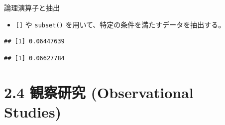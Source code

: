 \documentclass[
  ignorenonframetext,
]{beamer}
\newenvironment{Shaded}{\begin{snugshade}}{\end{snugshade}}
\newcommand{\AttributeTok}[1]{\textcolor[rgb]{0.77,0.63,0.00}{#1}}
\newcommand{\CommentTok}[1]{\textcolor[rgb]{0.56,0.35,0.01}{\textit{#1}}}
\newcommand{\FunctionTok}[1]{\textcolor[rgb]{0.00,0.00,0.00}{#1}}
\newcommand{\NormalTok}[1]{#1}
\newcommand{\OtherTok}[1]{\textcolor[rgb]{0.56,0.35,0.01}{#1}}
\newcommand{\SpecialCharTok}[1]{\textcolor[rgb]{0.00,0.00,0.00}{#1}}
\newcommand{\StringTok}[1]{\textcolor[rgb]{0.31,0.60,0.02}{#1}}
\providecommand{\tightlist}{%
  \setlength{\itemsep}{0pt}\setlength{\parskip}{0pt}}
\begin{document}
\begin{frame}[fragile]{論理演算子と抽出}
\protect\hypertarget{ux8ad6ux7406ux6f14ux7b97ux5b50ux3068ux62bdux51fa}{}
\begin{itemize}
\tightlist
\item
  \texttt{{[}{]}} や \texttt{subset()}
  を用いて、特定の条件を満たすデータを抽出する。
\end{itemize}

\begin{Shaded}
\end{Shaded}

\begin{verbatim}
## [1] 0.06447639
\end{verbatim}

\begin{Shaded}
\end{Shaded}

\begin{verbatim}
## [1] 0.06627784
\end{verbatim}
\end{frame}

\hypertarget{ux89b3ux5bdfux7814ux7a76-observational-studies}{%
\section{2.4 観察研究 (Observational
Studies)}\label{ux89b3ux5bdfux7814ux7a76-observational-studies}}
\end{document}
